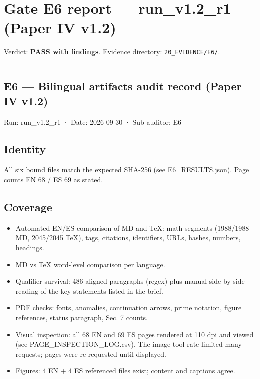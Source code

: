 \documentclass[
]{article}
\author{}
\date{}
\providecommand{\tightlist}{%
  \setlength{\itemsep}{0pt}\setlength{\parskip}{0pt}}
\begin{document}
\section{Gate E6 report --- run\_v1.2\_r1 (Paper IV
v1.2)}\label{gate-e6-report--run_v12_r1-paper-iv-v12}

Verdict: \textbf{PASS with findings}. Evidence directory:
\texttt{20\_EVIDENCE/E6/}.

\begin{center}\rule{0.5\linewidth}{0.5pt}\end{center}

\subsection{E6 --- Bilingual artifacts audit record (Paper IV
v1.2)}\label{e6--bilingual-artifacts-audit-record-paper-iv-v12}

Run: run\_v1.2\_r1 · Date: 2026-09-30 · Sub-auditor: E6

\subsection{Identity}\label{identity}

All six bound files match the expected SHA-256 (see E6\_RESULTS.json).
Page counts EN 68 / ES 69 as stated.

\subsection{Coverage}\label{coverage}

\begin{itemize}
\tightlist
\item
  Automated EN/ES comparison of MD and TeX: math segments (1988/1988 MD,
  2045/2045 TeX), tags, citations, identifiers, URLs, hashes, numbers,
  headings.
\item
  MD vs TeX word-level comparison per language.
\item
  Qualifier survival: 486 aligned paragraphs (regex) plus manual
  side-by-side reading of the key statements listed in the brief.
\item
  PDF checks: fonts, anomalies, continuation arrows, prime notation,
  figure references, status paragraph, Sec. 7 counts.
\item
  Visual inspection: all 68 EN and 69 ES pages rendered at 110 dpi and
  viewed (see PAGE\_INSPECTION\_LOG.csv). The image tool rate-limited
  many requests; pages were re-requested until displayed.
\item
  Figures: 4 EN + 4 ES referenced files exist; content and captions
  agree.
\end{itemize}
\end{document}
